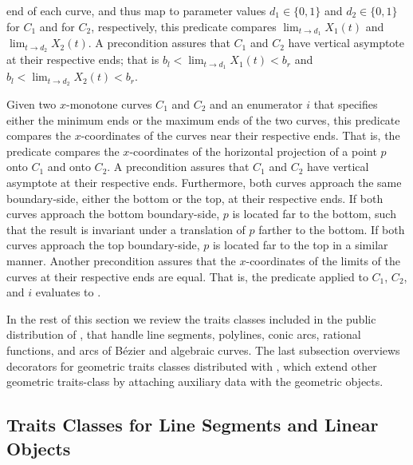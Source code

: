\begin{description}
    end of each curve, and thus map to parameter values
    $d_1\in \{0,1\}$ and $d_2 \in \{0,1\}$ for $C_1$ and for $C_2$,
    respectively, this predicate compares
    $\lim_{t \rightarrow d_1} X_1(t)$ and $\lim_{t \rightarrow d_2} X_2(t)$.
    A precondition assures that $C_1$ and $C_2$ have vertical
    asymptote at their respective ends; that is
    $b_l < \lim_{t \rightarrow d_1} X_1(t) < b_r$ and
    $b_l < \lim_{t \rightarrow d_2} X_2(t)< b_r$.
%
\item[\ccc{Compare_x_near_limit_2}:]
  Given two $x$-monotone curves $C_1$ and $C_2$ and an enumerator $i$
  that specifies either the minimum ends or the maximum ends of the
  two curves, this predicate compares the $x$-coordinates of the
  curves near their respective ends. That is, the predicate compares
  the $x$-coordinates of the horizontal projection of a point $p$ onto
  $C_1$ and onto $C_2$. A precondition assures that $C_1$ and $C_2$
  have vertical asymptote at their respective ends. Furthermore, both
  curves approach the same boundary-side, either the bottom or the
  top, at their respective ends. If both curves approach the bottom
  boundary-side, $p$ is located far to the bottom, such that the
  result is invariant under a translation of $p$ farther to the
  bottom. If both curves approach the top boundary-side, $p$ is
  located far to the top in a similar manner. Another precondition
  assures that the $x$-coordinates of the limits of the curves at
  their respective ends are equal. That is, the predicate
   applied to $C_1$, $C_2$, and $i$
  evaluates to .
\end{description}
\lcTex{\color{black}}

In the rest of this section we review the traits classes
included in the public distribution of \cgal, that handle line
segments, polylines, conic arcs, rational functions, and arcs of
B\'{e}zier and algebraic curves. 
The last subsection overviews
decorators for geometric traits classes distributed with \cgal,
which extend other geometric traits-class by attaching auxiliary
data with the geometric objects.

\subsection{Traits Classes for Line Segments and Linear Objects
\label{arr_ssec:tr_segs}}

